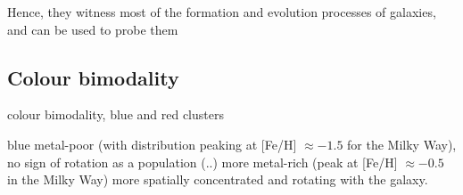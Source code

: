 \documentclass[a4paper,fleqn,usenatbib]{mnras}
\begin{document}
\begin{zitat}{\citet{2017MNRAS.465.3622R}}
Hence, they witness most of the formation and evolution processes of galaxies, and can be used to probe them \citep{2006ARA&A..44..193B}
\end{zitat}

\subsection{Colour bimodality}
\begin{zitat}{\citet{2017MNRAS.465.3622R}}
colour bimodality, blue and red clusters \citep[e.g.][]{1985ApJ...293..424Z, 1999AJ....118.1526G, 2001AJ....121.2974L, 2006ApJ...639...95P}
\end{zitat}

\begin{zitat}{\citet{2017MNRAS.465.3622R}}
blue metal-poor (with distribution peaking at [Fe/H] $\approx -1.5$ for the Milky Way), no sign of rotation as a population (..) more metal-rich (peak at [Fe/H] $\approx -0.5$ in the Milky  Way) more spatially concentrated and rotating with the galaxy. \citep{1996AJ....112.1487H}
\end{zitat}






\end{document}
